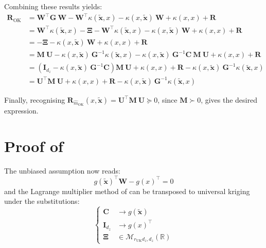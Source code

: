Combining these results yields:
\begin{equation}
	\begin{aligned}
	\mathbf{R}_{\mathrm{OK}}&=\mathbf{W}^\top \mathbf{G}\:\mathbf{W}-\mathbf{W}^\top \kappa(\tilde{\mathbf{x}},x)-\kappa(x,\tilde{\mathbf{x}})\:\mathbf{W}+\kappa(x,x)+\mathbf{R}\\
	&=\mathbf{W}^\top \kappa(\tilde{\mathbf{x}},x)-\boldsymbol{\Xi}-\mathbf{W}^\top \kappa(\tilde{\mathbf{x}},x)-\kappa(x,\tilde{\mathbf{x}})\:\mathbf{W}+\kappa(x,x)+\mathbf{R}\\
	&=-\boldsymbol{\Xi}-\kappa(x,\tilde{\mathbf{x}})\:\mathbf{W}+\kappa(x,x)+\mathbf{R}\\
	&=\mathbf{M}\:\mathbf{U}-\kappa(x,\tilde{\mathbf{x}})\:\mathbf{G}^{-1}\kappa(\tilde{\mathbf{x}},x)-\kappa(x,\tilde{\mathbf{x}})\:\mathbf{G}^{-1}\mathbf{C}\:\mathbf{M}\:\mathbf{U}+\kappa(x,x)+\mathbf{R}\\
	&=\left(\mathbf{I}_{d_z}-\kappa(x,\tilde{\mathbf{x}})\:\mathbf{G}^{-1}\mathbf{C}\right)\mathbf{M}\:\mathbf{U}+\kappa(x,x)+\mathbf{R}-\kappa(x,\tilde{\mathbf{x}})\:\mathbf{G}^{-1}\kappa(\tilde{\mathbf{x}},x)\\
	&=\mathbf{U}^\top \mathbf{M}\:\mathbf{U}+\kappa(x,x)+\mathbf{R}-\kappa(x,\tilde{\mathbf{x}})\:\mathbf{G}^{-1}\kappa(\tilde{\mathbf{x}},x)
	\end{aligned}
\end{equation}

Finally, recognising $\mathbf{R}_{\hat{m}_{\mathrm{OK}}}(x,\tilde{\mathbf{x}})=\mathbf{U}^\top \mathbf{M}\:\mathbf{U}\succeq0$, since $\mathbf{M}\succ0$, gives the desired expression.

\section[Proof of Proposition 3.9]{Proof of }\label{sec:proof_UK}

The unbiased assumption now reads:
\begin{equation}
	g(\tilde{\mathbf{x}})^\top \mathbf{W}-g(x)^\top=0
\end{equation}
and the Lagrange multiplier method of  can be transposed to universal kriging under the substitutions:
\begin{equation}
	\left\{\begin{aligned}
	\mathbf{C}&\longrightarrow g(\tilde{\mathbf{x}})\\
	\mathbf{I}_{d_z}&\longrightarrow g(x)^\top\\
	\boldsymbol{\Xi}&\in\mathcal{M}_{r_{\mathrm{UK}}d_z,d_z}(\mathbb{R})
	\end{aligned}\right.
\end{equation}

